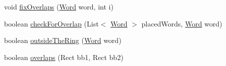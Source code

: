 \begin{DoxyCompactItemize}
void \mbox{\hyperlink{classio_1_1github_1_1syzygy2048_1_1radcloud_1_1_document_manager_a0cc957e8369ea7136b5b7eacc4ce8a13}{fix\+Overlaps}} (\mbox{\hyperlink{classio_1_1github_1_1syzygy2048_1_1radcloud_1_1_word}{Word}} word, int i)
\item 
boolean \mbox{\hyperlink{classio_1_1github_1_1syzygy2048_1_1radcloud_1_1_document_manager_a46efa97bb7935e67250b7386c2c31da7}{check\+For\+Overlap}} (List$<$ \mbox{\hyperlink{classio_1_1github_1_1syzygy2048_1_1radcloud_1_1_word}{Word}} $>$ placed\+Words, \mbox{\hyperlink{classio_1_1github_1_1syzygy2048_1_1radcloud_1_1_word}{Word}} word)
\item 
boolean \mbox{\hyperlink{classio_1_1github_1_1syzygy2048_1_1radcloud_1_1_document_manager_a418e7db1e3a441cbcf4b5bd2b90b31fd}{outside\+The\+Ring}} (\mbox{\hyperlink{classio_1_1github_1_1syzygy2048_1_1radcloud_1_1_word}{Word}} word)
\item 
boolean \mbox{\hyperlink{classio_1_1github_1_1syzygy2048_1_1radcloud_1_1_document_manager_acf53af046d9fbe0df0dd1c062a2c2398}{overlaps}} (Rect bb1, Rect bb2)
\end{DoxyCompactItemize}
